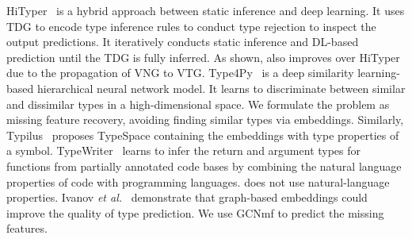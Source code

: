 HiTyper~\cite{HiTyper-icse22} is a hybrid approach between static
inference and deep learning. It uses TDG to encode type inference
rules to conduct type rejection to inspect the output predictions. It
iteratively conducts static inference and DL-based prediction until
the TDG is fully inferred.
As shown, {\tool} also improves over HiTyper due to the propagation of
VNG to VTG.
%
Type4Py~\cite{Type4Py-icse22} is a deep similarity learning-based
hierarchical neural network model. It learns to discriminate between
similar and dissimilar types in a high-dimensional space.
We formulate the problem as missing feature recovery,
avoiding finding similar types via embeddings.
Similarly, Typilus~\cite{typilus-pldi20} proposes TypeSpace
containing the embeddings with type properties of a
symbol. TypeWriter~\cite{typewriter-fse20} learns to infer the return
and argument types for functions from partially annotated code bases
by combining the natural language properties of code with programming
languages. {\tool} does not use natural-language
properties. Ivanov {\em et al.}~\cite{ivanov21predicting} demonstrate
that graph-based embeddings could improve the quality of type
prediction. We use GCNmf to predict the missing features.



